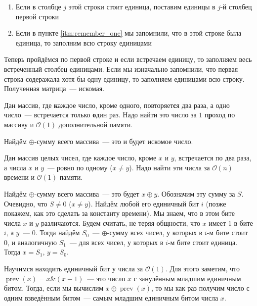 \documentclass[addpoints]{exam}
\DeclareMathOperator{\prev}{prev}
\begin{document}
\begin{questions}
\begin{solution}
\begin{enumerate}
\item Если в столбце $j$ этой строки стоит единица, поставим единицы в $j$-й столбец первой строки

\item Если в пункте \ref{itm:remember_one} мы запомнили, что в этой строке была единица, то заполним всю строку единицами

\end{enumerate}

Теперь пройдёмся по первой строке и если встречаем единицу, то заполняем весь встреченный столбец единицами. Если мы изначально запомнили, что первая строка содеражала хотя бы одну единицу, то заполняем единицами всю строку. Полученная матрица~--- искомая.

\end{solution}

\question[\half] Дан массив, где \textbf{к}аждое число, кроме одного, повторяет\textbf{с}я два раза, а одно число~--- встречается только \textbf{о}дин раз. Надо найти это число за $1$ п\textbf{р}оход по массиву и $\mathcal{O}(1)$ дополнительной памяти.

\begin{solution}

Найдём $\oplus$-сумму всего массива~--- это и будет искомое число.

\end{solution}

\question[1 \half] Дан массив целых чисел, где каждое число, кроме $x$ и $y$, встречается по два раза, а числа $x$ и $y$~--- ровно по одному ($x \neq y$). Надо найти эти числа за $\mathcal{O}(n)$ времени и $\mathcal{O}(1)$ памяти.

\begin{solution}

Найдём $\oplus$-сумму всего массива~--- это будет $x \oplus y$. Обозначим эту сумму за $S$. Очевидно, что $S \neq 0$ ($x \neq y$). Найдём любой его единичный бит $i$ (позже покажем, как это сделать за константу времени). Мы знаем, что в этом бите числа $x$ и $y$ различаются. Будем считать, не теряя общности, что $x$ имеет $1$ в бите $i$, а $y$~--- $0$. Тогда найдём $S_0$~--- $\oplus$-сумму всех чисел, у которых в $i$-м бите стоит $0$, и аналогичную $S_1$~--- для всех чисел, у которых в $i$-м бите стоит единица. Тогда $x = S_1$, $y = S_0$. 

Научимся находить единичный бит у числа за $\mathcal{O}(1)$. Для этого заметим, что $\prev(x) = x \& (x - 1)$~--- это число $x$ с занулённым младшим единичным битом. Тогда, если мы вычислим $x \oplus \prev(x)$, то мы как раз получим число с одним взведённым битом~--- самым младшим единичным битом числа $x$.


\end{solution}
\end{questions}
\end{document}
